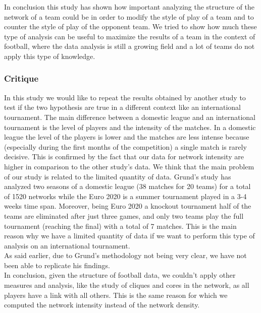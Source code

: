\documentclass[12pt, a4paper]{article}
\begin{document}
In conclusion this study has shown how important analyzing the structure of the network of a team could be in order to modify the style of play of a team and to counter the style of play of the opponent team. We tried to show how much these type of analysis can be useful to maximize the results of a team in the context of football, where the data analysis is still a growing field and a lot of teams do not apply this type of knowledge.\\

\subsubsection{Critique}
\label{critique}
In this study we would like to repeat the results obtained by another study \cite{GRUND} to test if the two hypothesis are true in a different context like an international tournament. The main difference between a domestic league and an international tournament is the level of players and the intensity of the matches. In a domestic league the level of the players is lower and the matches are less intense because  (especially during the first months of the competition) a single match is rarely decisive. This is confirmed by the fact that our data for network intensity are higher in comparison to the other study's data. 
We think that the main problem of our study is related to the limited quantity of data. Grund's study has analyzed two seasons of a domestic league (38 matches for 20 teams) for a total of 1520 networks while the Euro 2020 is a summer tournament played in a 3-4 weeks time span. Moreover, being Euro 2020 a knockout tournament half of the teams are eliminated after just three games, and only two teams play the full tournament (reaching the final) with a total of 7 matches. This is the main reason why we have a limited quantity of data if we want to perform this type of analysis on an international tournament. \\
As said earlier, due to Grund's methodology not being very clear, we have not been able to replicate his findings.\\
In conclusion, given the structure of football data, we couldn't apply other measures and analysis, like the study of cliques and cores in the network, as all players have a link with all others. This is the same reason for which we computed the network intensity instead of the network density. \\





\nocite{*}
\end{document}

